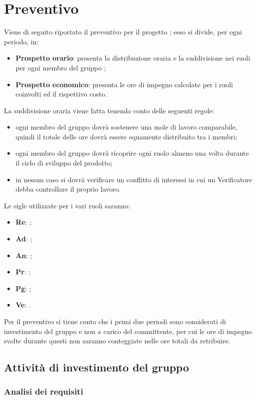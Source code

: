 \newpage
\section{Preventivo}

Viene di seguito riportato il preventivo per il progetto \NomeProgetto{}; esso si divide, per ogni periodo, in:
\begin{itemize}
	\item \textbf{Prospetto orario}: presenta la distribuzione oraria e la suddivisione nei ruoli per ogni membro del gruppo \gruppo;
	\item \textbf{Prospetto economico}: presenta le ore di impegno calcolate per i ruoli coinvolti ed il rispettivo costo.
\end{itemize}
La suddivisione oraria viene fatta tenendo conto delle seguenti regole:
\begin{itemize}
	\item ogni membro del gruppo dovrà sostenere una mole di lavoro comparabile, quindi il totale delle ore dovrà essere equamente distribuito tra i membri;
	\item ogni membro del gruppo dovrà ricoprire ogni ruolo almeno una volta durante il ciclo di sviluppo del prodotto;
	\item in nessun caso si dovrà verificare un conflitto di interessi in cui un Verificatore debba	controllare il proprio lavoro.
\end{itemize}
Le sigle utilizzate per i vari ruoli saranno:
\begin{itemize}
	\item \textbf{Re}: \RdP;
	\item \textbf{Ad}: \adm;
	\item \textbf{An}: \ana;
	\item \textbf{Pr}: \prog;
	\item \textbf{Pg}: \progr;
	\item \textbf{Ve}: \ver.
\end{itemize}
Per il preventivo si tiene conto che i primi due periodi sono considerati di investimento del gruppo e non a carico del committente, per cui le ore di impegno svolte durante questi non saranno conteggiate nelle ore totali da retribuire.
\newpage
\subsection{Attività di investimento del gruppo}
\subsubsection{Analisi dei requisiti}
